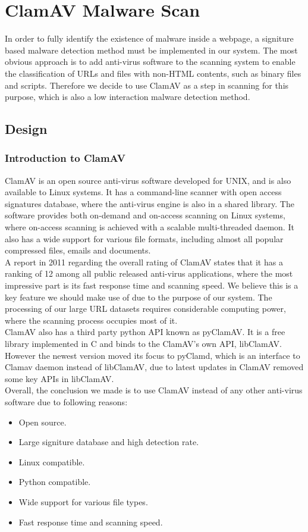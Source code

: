 
\section{ClamAV Malware Scan}
In order to fully identify the existence of malware inside a webpage, a 
signiture based malware detection method must be implemented in our system. 
The most obvious approach is to add anti-virus software to the scanning system 
to enable the classification of URLs and files with non-HTML contents, such 
as binary files and scripts. Therefore we decide to use ClamAV as a step in 
scanning for this purpose, which is also a low interaction malware detection 
method. 

\subsection{Design}
\subsubsection{Introduction to ClamAV}
ClamAV is an open source anti-virus software developed for UNIX, and is also 
available to Linux systems. It has a command-line scanner with open access 
signatures database, where the anti-virus engine is also in a shared library. 
The software provides both on-demand and on-access scanning on Linux systems, 
where on-access scanning is achieved with a scalable multi-threaded daemon. 
It also has a wide support for various file formats, including almost all 
popular compressed files, emails and documents. \\
A report in 2011 regarding the overall rating of ClamAV states that it has a 
ranking of 12 among all public released anti-virus 
applications,\cite{shandowserver} where the most impressive part is its fast 
response time and scanning speed. We believe this is a key feature we should 
make use of due to the purpose of our system. The processing of our large URL
datasets requires considerable computing power, where the scanning process 
occupies most of it. \\
ClamAV also has a third party python API known as pyClamAV. It is a free 
library implemented in C and binds to the ClamAV's own API, libClamAV. However 
the newest version moved its focus to pyClamd, which is an interface to Clamav 
daemon instead of libClamAV, due to latest updates in ClamAV removed some key 
APIs in libClamAV. \\
Overall, the conclusion we made is to use ClamAV instead of any other 
anti-virus software due to following reasons: 
\begin{itemize}
\item Open source.
\item Large signiture database and high detection rate.
\item Linux compatible. 
\item Python compatible. 
\item Wide support for various file types. 
\item Fast response time and scanning speed. 
\end{itemize}

